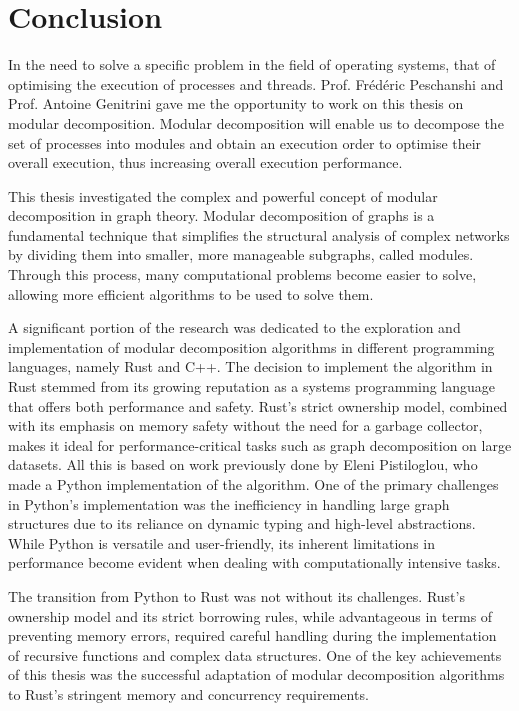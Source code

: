 

\chapter{Conclusion}\label{ch:conclusion}


In the need to solve a specific problem in the field of operating systems, that of optimising the execution of processes and threads.
Prof. Frédéric Peschanshi and Prof. Antoine Genitrini gave me the opportunity to work on this thesis on modular decomposition.
Modular decomposition will enable us to decompose the set of processes into modules and obtain an execution order to optimise their overall execution, thus increasing overall execution performance.

This thesis investigated the complex and powerful concept of modular decomposition in graph theory.
Modular decomposition of graphs is a fundamental technique that simplifies the structural analysis of complex networks by dividing them into smaller, more manageable subgraphs, called modules.
Through this process, many computational problems become easier to solve, allowing more efficient algorithms to be used to solve them.

A significant portion of the research was dedicated to the exploration and implementation of modular decomposition algorithms in different programming languages, namely Rust and C++.
The decision to implement the algorithm in Rust stemmed from its growing reputation as a systems programming language that offers both performance and safety.
Rust’s strict ownership model, combined with its emphasis on memory safety without the need for a garbage collector, makes it ideal for performance-critical tasks such as graph decomposition on large datasets.
All this is based on work previously done by Eleni Pistiloglou, who made a Python implementation of the algorithm.
One of the primary challenges in Python's implementation was the inefficiency in handling large graph structures due to its reliance on dynamic typing and high-level abstractions.
While Python is versatile and user-friendly, its inherent limitations in performance become evident when dealing with computationally intensive tasks.

The transition from Python to Rust was not without its challenges.
Rust’s ownership model and its strict borrowing rules, while advantageous in terms of preventing memory errors, required careful handling during the implementation of recursive functions and complex data structures.
One of the key achievements of this thesis was the successful adaptation of modular decomposition algorithms to Rust’s stringent memory and concurrency requirements.

